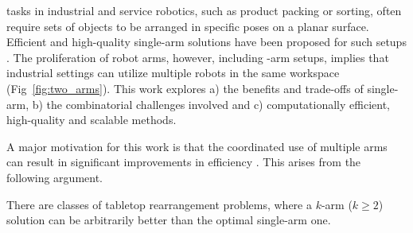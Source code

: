 
 tasks in industrial and service robotics, such as product packing or sorting, often require sets of objects to be arranged in
specific poses on a planar surface. Efficient and high-quality
single-arm solutions have been proposed for such
setups \cite{193}. The proliferation of robot arms, however, including \dual-arm setups, implies that industrial settings can utilize multiple robots in the same workspace (Fig~\ref{fig:two_arms}). This work explores a) the benefits and trade-offs of  single-arm, b) the combinatorial challenges involved and c) computationally efficient, high-quality and scalable methods.

 


A major motivation for this work is that the coordinated use of multiple arms  can
result in significant improvements in efficiency . This arises from the following argument.

\begin{observation}\label{l:k-arm-lower-bound}
There are classes of tabletop rearrangement problems, where a $k$-arm
($k \ge 2$) solution can be arbitrarily better than the optimal
single-arm one.
\end{observation}

